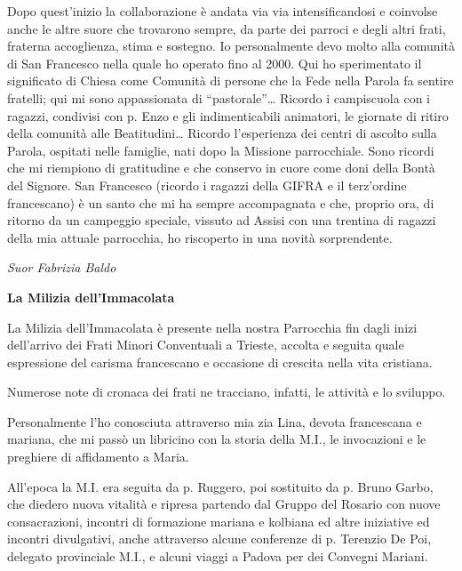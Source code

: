 Dopo quest’inizio la collaborazione è andata via via intensificandosi e coinvolse anche le 
altre suore che trovarono sempre, da parte dei parroci e degli altri frati, fraterna accoglienza, stima e 
sostegno. Io personalmente devo molto alla comunità di San Francesco nella quale ho operato fino 
al 2000. Qui ho sperimentato il significato di Chiesa come Comunità di persone che la Fede nella 
Parola fa sentire fratelli; qui mi sono appassionata di “pastorale”… Ricordo i campiscuola con i 
ragazzi,  condivisi con p. Enzo e gli indimenticabili animatori, le giornate di ritiro della comunità 
alle Beatitudini… Ricordo l’esperienza dei centri di ascolto sulla Parola, ospitati nelle famiglie, nati 
dopo la Missione parrocchiale. Sono ricordi che mi riempiono di gratitudine e che conservo in cuore 
come doni della Bontà del Signore. San Francesco (ricordo i  ragazzi della GIFRA e il terz’ordine 
francescano) è un santo che mi ha sempre accompagnata e che, proprio ora, di ritorno da un 
campeggio speciale, vissuto ad Assisi con una trentina di ragazzi della mia attuale parrocchia, ho 
riscoperto in una novità sorprendente.
\begin{flushright}
\textit{Suor Fabrizia Baldo}
\end{flushright}
\bigskip
{}
{}
\begin{center}
\textbf{\Large La Milizia dell'Immacolata}
\end{center}
\bigbreak
\noindent La Milizia dell’Immacolata è presente nella nostra Parrocchia fin dagli inizi dell’arrivo dei Frati
Minori Conventuali a Trieste, accolta e seguita quale espressione del carisma francescano e 
occasione di crescita nella vita cristiana.

Numerose note di cronaca dei frati ne tracciano, infatti, le attività e lo sviluppo.

Personalmente l’ho conosciuta attraverso mia zia Lina, devota francescana e mariana, che mi passò 
un libricino con la storia della M.I., le invocazioni e le preghiere di affidamento a Maria.

All’epoca la M.I. era seguita da p. Ruggero, poi sostituito da p. Bruno Garbo, che diedero nuova 
vitalità e ripresa partendo dal Gruppo del Rosario con nuove consacrazioni, incontri di formazione 
mariana e kolbiana ed altre iniziative ed incontri divulgativi, anche attraverso alcune conferenze di 
p. Terenzio De Poi, delegato provinciale M.I., e alcuni viaggi a Padova per dei Convegni Mariani.

